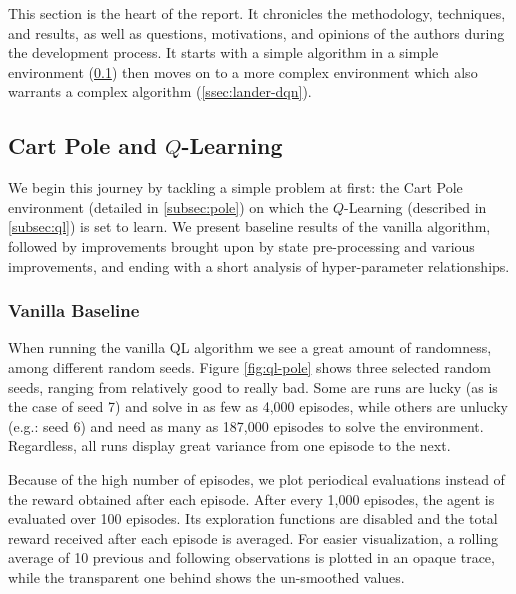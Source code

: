 \documentclass{article}
\begin{document}
This section is the heart of the report. It chronicles the methodology, techniques, and results, as well as questions, motivations, and opinions of the authors during the development process. It starts with a simple algorithm in a simple environment (\ref{ssec:pole-ql}) then moves on to a more complex environment which also warrants a complex algorithm (\ref{ssec:lander-dqn}).

\subsection{Cart Pole and $Q$-Learning}
\label{ssec:pole-ql}

We begin this journey by tackling a simple problem at first: the Cart Pole environment (detailed in \ref{subsec:pole}) on which the $Q$-Learning (described in  \ref{subsec:ql}) is set to learn. We present baseline results of the vanilla algorithm, followed by improvements brought upon by state pre-processing and various improvements, and ending with a short analysis of hyper-parameter relationships.

\subsubsection{Vanilla Baseline}

When running the vanilla QL algorithm we see a great amount of randomness, among different random seeds. Figure \ref{fig:ql-pole} shows three selected random seeds, ranging from relatively good to really bad. Some are runs are lucky (as is the case of seed 7) and solve in as few as 4,000 episodes, while others are unlucky (e.g.: seed 6) and need as many as 187,000 episodes to solve the environment. Regardless, all runs display great variance from one episode to the next.

Because of the high number of episodes, we plot periodical evaluations instead of the reward obtained after each episode. After every 1,000 episodes, the agent is evaluated over 100 episodes. Its exploration functions are disabled and the total reward received after each episode is averaged. For easier visualization, a rolling average of 10 previous and following observations is plotted in an opaque trace, while the transparent one behind shows the un-smoothed values.
\end{document}
